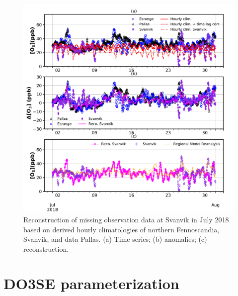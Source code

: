 \documentclass[bg, manuscript]{copernicus}
\begin{document}
\begin{figure}[t]
  \includegraphics[width=12cm]{figA3}
  \caption{Reconstruction of missing \chem{[O_3]} observation data at Svanvik in July 2018 based on derived hourly climatologies of northern Fennoscandia, Svanvik, and data Pallas. (a) Time series; (b) anomalies; (c) reconstruction.}
  \label{fig:ozone_reconstruction_2018_07}
\end{figure}

\clearpage

\section{DO3SE parameterization}
\end{document}
